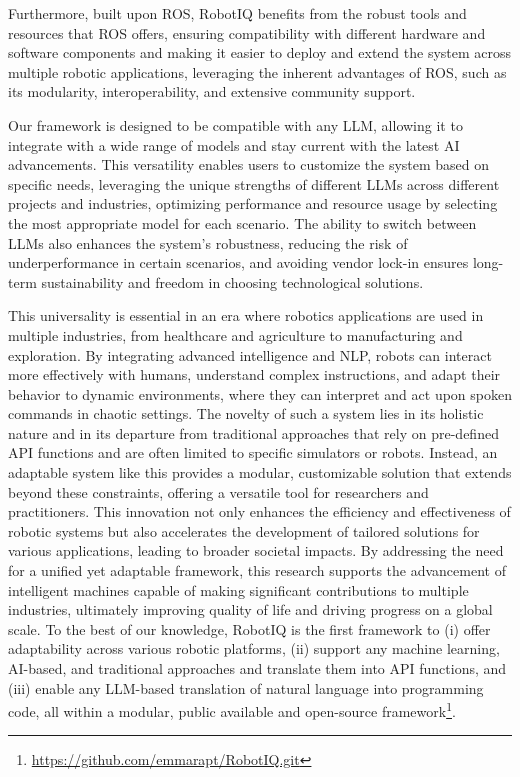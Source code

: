 Furthermore, built upon ROS, RobotIQ benefits from the robust tools and resources that ROS offers, ensuring compatibility with different hardware and software components and making it easier to deploy and extend the system across multiple robotic applications, leveraging the inherent advantages of ROS, such as its modularity, interoperability, and extensive community support. 

Our framework is designed to be compatible with any LLM, allowing it to integrate with a wide range of models and stay current with the latest AI advancements. This versatility enables users to customize the system based on specific needs, leveraging the unique strengths of different LLMs across different projects and industries, optimizing performance and resource usage by selecting the most appropriate model for each scenario. The ability to switch between LLMs also enhances the system's robustness, reducing the risk of underperformance in certain scenarios, and avoiding vendor lock-in ensures long-term sustainability and freedom in choosing technological solutions.

This universality is essential in an era where robotics applications are used in multiple industries, from healthcare and agriculture to manufacturing and exploration. By integrating advanced intelligence and NLP, robots can interact more effectively with humans, understand complex instructions, and adapt their behavior to dynamic environments, where they can interpret and act upon spoken commands in chaotic settings. The novelty of such a system lies in its holistic nature and in its departure from traditional approaches that rely on pre-defined API functions and are often limited to specific simulators or robots. Instead, an adaptable system like this provides a modular, customizable solution that extends beyond these constraints, offering a versatile tool for researchers and practitioners. This innovation not only enhances the efficiency and effectiveness of robotic systems but also accelerates the development of tailored solutions for various applications, leading to broader societal impacts. By addressing the need for a unified yet adaptable framework, this research supports the advancement of intelligent machines capable of making significant contributions to multiple industries, ultimately improving quality of life and driving progress on a global scale. To the best of our knowledge, RobotIQ is the first framework to (i) offer adaptability across various robotic platforms, (ii) support any machine learning, AI-based, and traditional approaches and translate them into API functions, and (iii) enable any LLM-based translation of natural language into programming code, all within a modular, public available and open-source framework\footnote{\url{https://github.com/emmarapt/RobotIQ.git}}.

